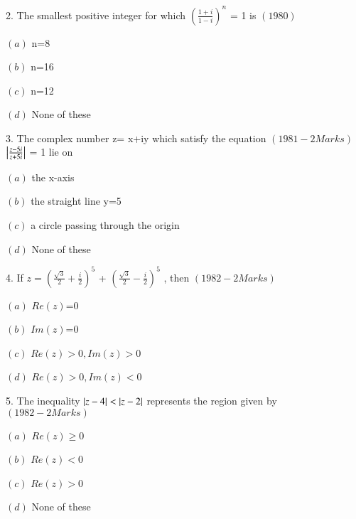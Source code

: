 \documentclass[journal,12pt,twocolumn]{IEEEtran}
\theoremstyle{remark}
\begin{document}
2.  The smallest positive integer for which
    $(\frac{1+i}{1-i})^n$ = 1 is  \hfill$(1980)$ 
\begin{multicols}
\item $(a)$  n=8
\item $(b)$  n=16
\item $(c)$  n=12
\item $(d)$  None of these\\
\end{multicols}
3.  The complex number z= x+iy which satisfy the equation \hfill$(1981 - 2 Marks)$\\
     $\left\vert\frac{z-5i}{z+5i}\right\vert$ = 1 lie on 
\begin{multicols}
\item $(a)$  the x-axis
\item $(b)$  the straight line y=5
\item $(c)$  a circle passing through the origin 
\item $(d)$  None of these\\
\end{multicols}
4.  If $z=(\frac{\sqrt{3}}{2} + \frac{i}{2})^5$ + $(\frac{\sqrt{3}}{2} - \frac{i}{2})^5$ , then \hfill$(1982 - 2 Marks)$
\begin{multicols}
\item $(a)$ $Re(z)$=0
\item $(b)$ $Im(z)$=0
\item $(c)$ $Re(z)>0, Im(z)>0$
\item $(d)$ $Re(z)>0,  Im(z)<0$\\
\end{multicols}
5.  The inequality $\left\vert z-4\right\vert<\left\vert z-2\right\vert$ represents the region given by \hfill$(1982 - 2 Marks)$
\begin{multicols}
\item $(a)$ $Re(z)\ge0$
\item $(b)$ $Re(z)<0$ 
\item $(c)$ $Re(z)>0$ 
\item $(d)$ None of these
\end{multicols}
\end{document}
